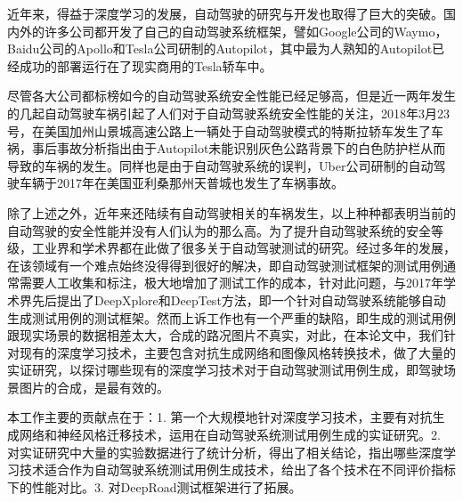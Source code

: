 \begin{cabstract}

近年来，得益于深度学习的发展，自动驾驶的研究与开发也取得了巨大的突破。国内外的许多公司都开发了自己的自动驾驶系统框架，譬如Google公司的Waymo，Baidu公司的Apollo和Tesla公司研制的Autopilot，其中最为人熟知的Autopilot已经成功的部署运行在了现实商用的Tesla轿车中。

尽管各大公司都标榜如今的自动驾驶系统安全性能已经足够高，但是近一两年发生的几起自动驾驶车祸引起了人们对于自动驾驶系统安全性能的关注，2018年3月23号，在美国加州山景城高速公路上一辆处于自动驾驶模式的特斯拉轿车发生了车祸，事后事故分析指出由于Autopilot未能识别灰色公路背景下的白色防护栏从而导致的车祸的发生。同样也是由于自动驾驶系统的误判，Uber公司研制的自动驾驶车辆于2017年在美国亚利桑那州天普城也发生了车祸事故。

除了上述之外，近年来还陆续有自动驾驶相关的车祸发生，以上种种都表明当前的自动驾驶的安全性能并没有人们认为的那么高。为了提升自动驾驶系统的安全等级，工业界和学术界都在此做了很多关于自动驾驶测试的研究。经过多年的发展，在该领域有一个难点始终没得得到很好的解决，即自动驾驶测试框架的测试用例通常需要人工收集和标注，极大地增加了测试工作的成本，针对此问题，与2017年学术界先后提出了DeepXplore\cite{DeepXplore}和DeepTest\cite{DeepTest}方法，即一个针对自动驾驶系统能够自动生成测试用例的测试框架。然而上诉工作也有一个严重的缺陷，即生成的测试用例跟现实场景的数据相差太大，合成的路况图片不真实，对此，在本论文中，我们针对现有的深度学习技术，主要包含对抗生成网络和图像风格转换技术，做了大量的实证研究，以探讨哪些现有的深度学习技术对于自动驾驶测试用例生成，即驾驶场景图片的合成，是最有效的。 

本工作主要的贡献点在于：1. 第一个大规模地针对深度学习技术，主要有对抗生成网络和神经风格迁移技术，运用在自动驾驶系统测试用例生成的实证研究。2. 对实证研究中大量的实验数据进行了统计分析，得出了相关结论，指出哪些深度学习技术适合作为自动驾驶系统测试用例生成技术，给出了各个技术在不同评价指标下的性能对比。3. 对DeepRoad测试框架进行了拓展。

\end{cabstract}

